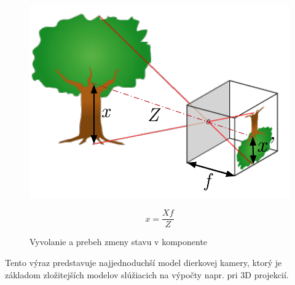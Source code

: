 \begin{figure}[H]
    \centering
    \begin{minipage}[b]{0.49\textwidth}
        \includegraphics[width=\textwidth]{images/holeCamera}
        \caption{Vyvolanie a prebeh zmeny stavu v komponente}
    \end{minipage}
    \hfill
    \begin{minipage}[b]{0.4\textwidth}
        $$\textit{x}=\frac{X\textit{f}}{Z}$$
        \vspace*{2.5cm}
    \end{minipage}
\end{figure}

Tento výraz predstavuje najjednoduchší model dierkovej kamery, ktorý je základom zložitejších modelov slúžiacich na výpočty napr. pri 3D projekcií. 

